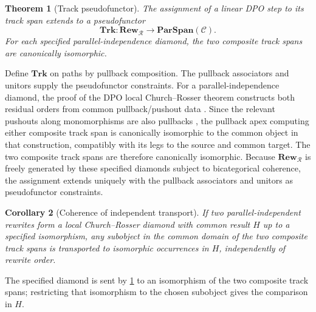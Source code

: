 \documentclass[12pt,a4paper,twoside]{extarticle}
\makeatletter
\theoremstyle{compactplain}
\newtheorem{theorem}{Theorem}[section]
\newtheorem{corollary}[theorem]{Corollary}
\theoremstyle{compactdef}
\renewenvironment{proof}[1][\proofname]{\par\pushQED{\qed}\normalfont
  \topsep2pt\trivlist\item[\hskip\labelsep\bfseries #1\@addpunct{.}]\ignorespaces}
 {\popQED\endtrivlist\@endpefalse}
\makeatother
\begin{document}
\begin{theorem}[Track pseudofunctor]\label{thm:track-pseudo}
The assignment of a linear DPO step to its track span extends to a pseudofunctor
\[
\mathbf{Trk}:\mathbf{Rew}_{\mathcal R}\longrightarrow\mathbf{ParSpan}(\mathcal C).
\]
For each specified parallel-independence diamond, the two composite track spans are canonically isomorphic.
\end{theorem}
\begin{proof}
Define $\mathbf{Trk}$ on paths by pullback composition. The pullback associators and unitors supply the pseudofunctor constraints. For a parallel-independence diamond, the proof of the DPO local Church--Rosser theorem constructs both residual orders from common pullback/pushout data \cite[Theorem~7.7]{lack-sobocinski}.  Since the relevant pushouts along monomorphisms are also pullbacks \cite[Lemma~4.3]{lack-sobocinski}, the pullback apex computing either composite track span is canonically isomorphic to the common object in that construction, compatibly with its legs to the source and common target.  The two composite track spans are therefore canonically isomorphic.  Because $\mathbf{Rew}_{\mathcal R}$ is freely generated by these specified diamonds subject to bicategorical coherence, the assignment extends uniquely with the pullback associators and unitors as pseudofunctor constraints.
\end{proof}

\begin{corollary}[Coherence of independent transport]
If two parallel-independent rewrites form a local Church--Rosser diamond with common result $H$ up to a specified isomorphism, any subobject in the common domain of the two composite track spans is transported to isomorphic occurrences in $H$, independently of rewrite order.
\end{corollary}
\begin{proof}
The specified diamond is sent by \cref{thm:track-pseudo} to an isomorphism of the two composite track spans; restricting that isomorphism to the chosen subobject gives the comparison in $H$.
\end{proof}
\end{document}
